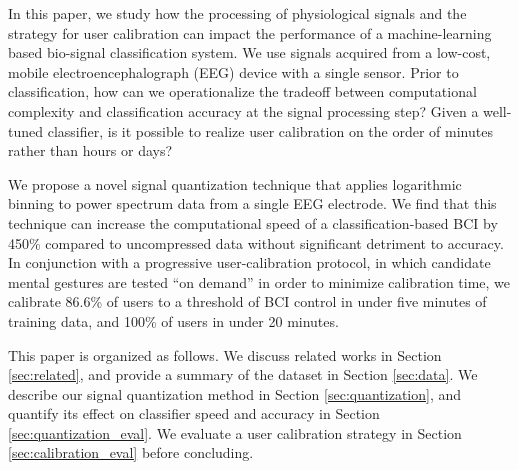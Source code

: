 
In this paper, we study how the processing of physiological signals and the strategy for user calibration can impact the performance of a machine-learning based bio-signal classification system. We use signals acquired from a low-cost, mobile electroencephalograph (EEG) device with a single sensor. Prior to classification, how can we operationalize the tradeoff between computational complexity and classification accuracy at the signal processing step? Given a well-tuned classifier, is it possible to realize user calibration on the order of minutes rather than hours or days?


We propose a novel signal quantization technique that applies logarithmic binning to power spectrum data from a single EEG electrode. We find that this technique can increase the computational speed of a classification-based BCI by 450\% compared to uncompressed data without significant detriment to accuracy. In conjunction with a progressive user-calibration protocol, in which candidate mental gestures are tested ``on demand'' in order to minimize calibration time, we calibrate 86.6\% of users to a threshold of BCI control in under five minutes of training data, and 100\% of users in under 20 minutes. 

This paper is organized as follows. We discuss related works in Section \ref{sec:related}, and provide a summary of the dataset in Section \ref{sec:data}. We describe our signal quantization method in Section \ref{sec:quantization}, and quantify its effect on classifier speed and accuracy in Section \ref{sec:quantization_eval}. We evaluate a user calibration strategy in Section \ref{sec:calibration_eval} before concluding.
